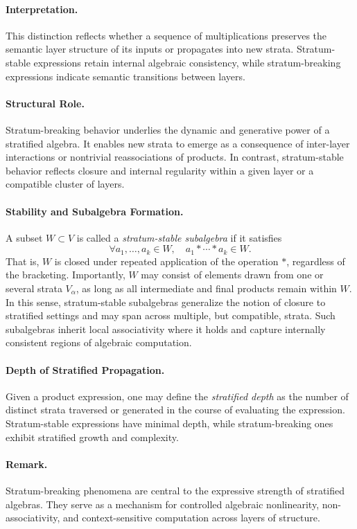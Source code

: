 \documentclass[12pt]{article}
\theoremstyle{definition}
\theoremstyle{plain}
\theoremstyle{remark}
\begin{document}
\paragraph{Interpretation.}
This distinction reflects whether a sequence of multiplications preserves the semantic layer structure of its inputs or propagates into new strata. Stratum-stable expressions retain internal algebraic consistency, while stratum-breaking expressions indicate semantic transitions between layers.

\paragraph{Structural Role.}
Stratum-breaking behavior underlies the dynamic and generative power of a stratified algebra. It enables new strata to emerge as a consequence of inter-layer interactions or nontrivial reassociations of products. In contrast, stratum-stable behavior reflects closure and internal regularity within a given layer or a compatible cluster of layers.

\paragraph{Stability and Subalgebra Formation.}
A subset \( W \subset V \) is called a \emph{stratum-stable subalgebra} if it satisfies
\[
\forall a_1, \ldots, a_k \in W, \quad a_1 * \cdots * a_k \in W.
\]
That is, \( W \) is closed under repeated application of the operation \( * \), regardless of the bracketing. Importantly, \( W \) may consist of elements drawn from one or several strata \( V_\alpha \), as long as all intermediate and final products remain within \( W \). In this sense, stratum-stable subalgebras generalize the notion of closure to stratified settings and may span across multiple, but compatible, strata. Such subalgebras inherit local associativity where it holds and capture internally consistent regions of algebraic computation.

\paragraph{Depth of Stratified Propagation.}
Given a product expression, one may define the \emph{stratified depth} as the number of distinct strata traversed or generated in the course of evaluating the expression. Stratum-stable expressions have minimal depth, while stratum-breaking ones exhibit stratified growth and complexity.

\paragraph{Remark.}
Stratum-breaking phenomena are central to the expressive strength of stratified algebras. They serve as a mechanism for controlled algebraic nonlinearity, non-associativity, and context-sensitive computation across layers of structure.
\end{document}
